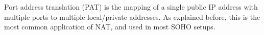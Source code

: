 Port address translation (PAT) is the mapping of a single public IP address with multiple ports to multiple local/private addresses. As explained before, this is the most common application of NAT, and used in most SOHO setups.
